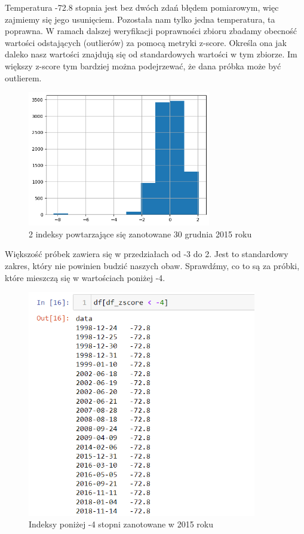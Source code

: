 \documentclass[12pt]{mwart}
\begin{document}
Temperatura -72.8 stopnia jest bez dwóch zdań błędem pomiarowym, więc zajmiemy się jego usunięciem. Pozostała nam tylko jedna temperatura, ta poprawna. W ramach dalszej weryfikacji poprawności zbioru zbadamy obecność wartości odstających (outlierów) za pomocą metryki z-score. Określa ona jak daleko nasz wartości znajdują się od standardowych wartości w tym zbiorze. Im większy z-score tym bardziej można podejrzewać, że dana próbka może być outlierem.\\
\begin{figure}[h]
	
	\includegraphics[width=8cm]{outlier.png}
	\caption{2 indeksy powtarzające się zanotowane 30 grudnia 2015 roku}
\end{figure}
\newpage
Większość próbek zawiera się w przedziałach od -3 do 2. Jest to standardowy zakres, który nie powinien budzić naszych obaw. Sprawdźmy, co to są za próbki, które mieszczą się w wartościach poniżej -4.\\
\begin{figure}[h]
	
	\includegraphics[width=10cm]{outlier1.png}
	\caption{Indeksy poniżej -4 stopni zanotowane w 2015 roku}
\end{figure}
\end{document}

